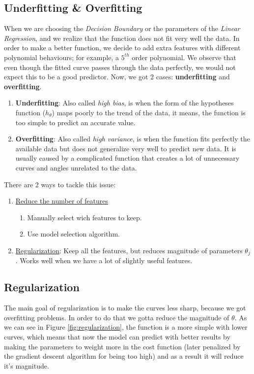 \subsection{Underfitting \& Overfitting}
When we are choosing the \textit{Decision Boundary} or the parameters of the \textit{Linear Regression}, and we realize that the function does not fit very well the data. In order to make a better function, we decide to add extra features with different polynomial behaviours; for example, a $5^{th}$ order polynomial.
We observe that even though the fitted curve passes through the data perfectly, we would not expect this to be a good predictor. Now, we got 2 cases: \textbf{underfitting} and \textbf{overfitting}.

\begin{enumerate}[label=\arabic*.]
	\item \textbf{Underfitting}: Also called \textit{high bias}, is when the form of the hypotheses function ($h_{\theta}$) maps poorly to the trend of the data, it means, the function is too simple to predict an accurate value.
	\item \textbf{Overfitting}: Also called \textit{high variance}, is when the function fits perfectly the available data but does not generalize very well to predict new data. It is usually caused by a complicated function that creates a lot of unnecessary curves and angles unrelated to the data.
\end{enumerate}

There are 2 ways to tackle this issue:
\begin{enumerate}[label=\arabic*.]
	\item \underline{Reduce the number of features}
	\begin{enumerate}[label=\textbullet]
		\item Manually select wich features to keep.
		\item Use model selection algorithm.
	\end{enumerate}
	\item \underline{Regularization}: Keep all the features, but reduces magnitude of parameters $\theta_j$. Works well when we have a lot of slightly useful features.

\end{enumerate}

\subsection{Regularization}
The main goal of regularization is to make the curves less sharp, because we got overfitting problems. In order to do that we gotta reduce the magnitude of $\theta$. As we can see in Figure \ref{fig:regularization}, the function is a more simple with lower curves, which means that now the model can predict with better results by making the parameters to weight more in the cost function (later penalized by the gradient descent algorithm for being too high) and as a result it will reduce it's magnitude.

